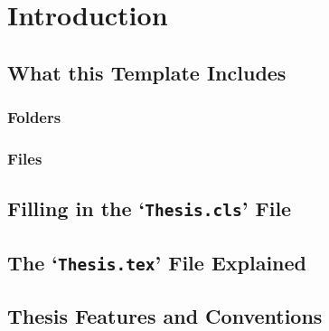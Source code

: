 
\chapter{Introduction} %

\label{Chapter1} %




\section{What this Template Includes}

\subsection{Folders}



\subsection{Files}




\section{Filling in the `\texttt{Thesis.cls}' File}\label{FillingFile}



\section{The `\texttt{Thesis.tex}' File Explained}




\section{Thesis Features and Conventions}\label{ThesisConventions}


